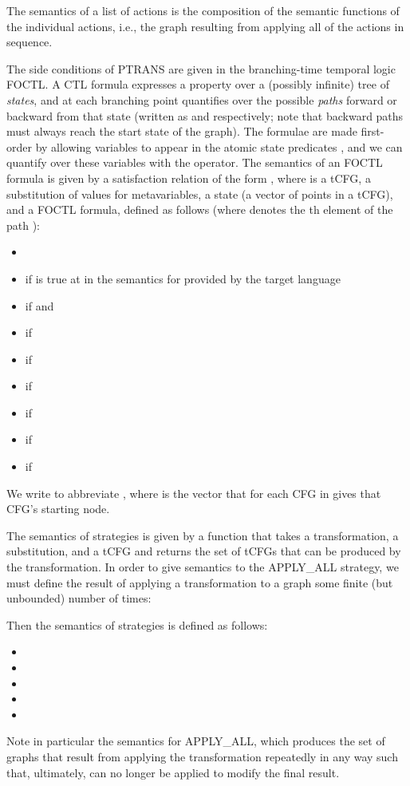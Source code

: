\documentclass{eptcs}
\newcommand{\ptrans}[0]{PTRANS}
\begin{document}
The semantics of a list of actions  is the composition of the semantic functions of the individual actions, i.e., the graph resulting from applying all of the actions in sequence. 

\label{CTL}
The side conditions of {\ptrans} are given in the branching-time temporal logic \ac{FOCTL}. A \ac{CTL} formula expresses a property over a (possibly infinite) tree of \emph{states}, and at each branching point quantifies over the possible \emph{paths} forward or backward from that state (written as  and  respectively; note that backward paths must always reach the start state of the graph). The formulae are made first-order by allowing variables to appear in the atomic state predicates , and we can quantify over these variables with the  operator. The semantics of an \ac{FOCTL} formula is given by a satisfaction relation of the form , where  is a \ac{tCFG},  a substitution of values for metavariables,  a state (a vector of points in a \ac{tCFG}), and  a \ac{FOCTL} formula, defined as follows (where  denotes the th element of the path ):
\begin{itemize}
\item 
\item  if  is true at  in the semantics for  provided by the target language
\item  if  and 
\item  if 
\item  if 
\item  if 
\item  if 
\item  if 
\item  if 
\end{itemize}
We write  to abbreviate , where  is the vector that for each \ac{CFG} in  gives that \ac{CFG}'s starting node.

The semantics of strategies is given by a function  that takes a transformation, a substitution, and a \ac{tCFG} and returns the set of \acp{tCFG} that can be produced by the transformation. In order to give semantics to the APPLY\_ALL strategy, we must define the result of applying a transformation to a graph some finite (but unbounded) number of times:

Then the semantics of strategies is defined as follows:
\begin{itemize}
\item 
\item 
\item 
\item 
\item 
\end{itemize}
Note in particular the semantics for APPLY\_ALL, which produces the set of graphs that result from applying the transformation  repeatedly in any way such that, ultimately,  can no longer be applied to modify the final result.
\end{document}
